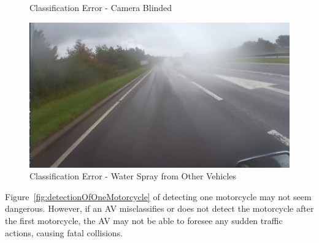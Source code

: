 \documentclass[conference]{IEEEtran}
\begin{document}
\begin{figure}[h]
\begin{minipage}{0.15\textwidth}
			\caption{Classification Error - Camera Blinded}
			\label{fig:detectionOfMotorcycleW2}
		\end{minipage}\hfill
		\begin{minipage}{0.15\textwidth}
			\centering
			\includegraphics[width=\linewidth]{Figures/wet_danger.png}
			\caption{Classification Error - Water Spray from Other Vehicles}
			\label{fig:detectionOfMotorcycleW3}
		\end{minipage}
	\end{figure}	

    Figure~\ref{fig:detectionOfOneMotorcycle} of detecting one motorcycle may not seem dangerous. However, if an AV misclassifies or does not detect the motorcycle after the first motorcycle, the AV may not be able to foresee any sudden traffic actions, causing fatal collisions.
\end{document}
